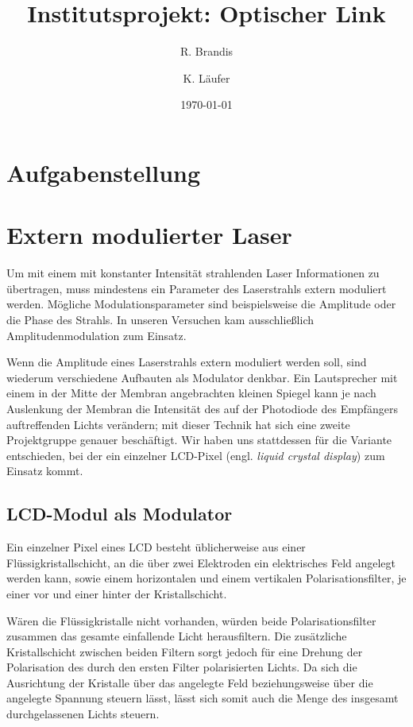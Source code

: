 \documentclass[12pt,a4paper]{article}
\title{Institutsprojekt: Optischer Link}
\author{R. Brandis \and K. Läufer}
\date{\today}
\begin{document}
\maketitle
\newpage
\tableofcontents
\newpage

\section{Aufgabenstellung}



\section{Extern modulierter Laser}
Um mit einem mit konstanter Intensität strahlenden Laser Informationen zu übertragen, muss mindestens ein Parameter des Laserstrahls extern moduliert werden. Mögliche Modulationsparameter sind beispielsweise die Amplitude oder die Phase des Strahls. In unseren Versuchen kam ausschließlich Amplitudenmodulation zum Einsatz.

Wenn die Amplitude eines Laserstrahls extern moduliert werden soll, sind wiederum verschiedene Aufbauten als Modulator denkbar. Ein Lautsprecher mit einem in der Mitte der Membran angebrachten kleinen Spiegel kann je nach Auslenkung der Membran die Intensität des auf der Photodiode des Empfängers auftreffenden Lichts verändern; mit dieser Technik hat sich eine zweite Projektgruppe genauer beschäftigt. Wir haben uns stattdessen für die Variante entschieden, bei der ein einzelner LCD-Pixel (engl. \textit{liquid crystal display}) zum Einsatz kommt.

\subsection{LCD-Modul als Modulator}
Ein einzelner Pixel eines LCD besteht üblicherweise aus einer Flüssigkristallschicht, an die über zwei Elektroden ein elektrisches Feld angelegt werden kann, sowie einem horizontalen und einem vertikalen Polarisationsfilter, je einer vor und einer hinter der Kristallschicht.

Wären die Flüssigkristalle nicht vorhanden, würden beide Polarisationsfilter zusammen das gesamte einfallende Licht herausfiltern. Die zusätzliche Kristallschicht zwischen beiden Filtern sorgt jedoch für eine Drehung der Polarisation des durch den ersten Filter polarisierten Lichts. Da sich die Ausrichtung der Kristalle über das angelegte Feld beziehungsweise über die angelegte Spannung steuern lässt, lässt sich somit auch die Menge des insgesamt durchgelassenen Lichts steuern.
\end{document}
